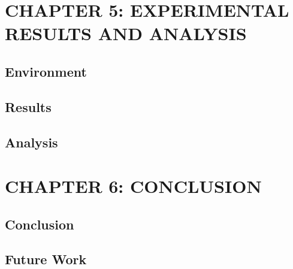 \documentclass[12pt]{article}
\begin{document}
\newpage
\section{CHAPTER 5: EXPERIMENTAL RESULTS AND ANALYSIS}
\subsection{Environment}

\subsection{Results}

\subsection{Analysis}
\newpage
\section{CHAPTER 6: CONCLUSION}

\subsection{Conclusion}

\subsection{Future Work}
\newpage
\printbibliography[heading=bibintoc,title={REFERENCES}]
\end{document}
